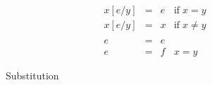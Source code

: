 \begin{figure}
\[
\begin{array}{rcll}
x[e/y] & = & e & \mbox{if}\;x=y \\
x[e/y] & = & x & \mbox{if}\;x\neq y \\
{} & {} & {} & {} \\
e & = & e &  \\
e & = & f & x=y
\end{array}
\]
\caption{Substitution}
\end{figure}
